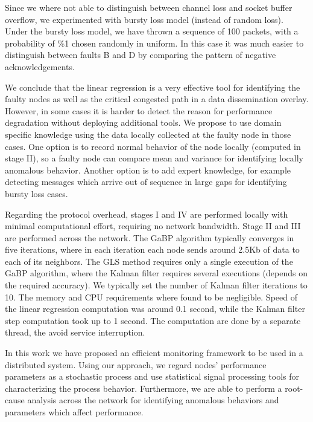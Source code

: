 \documentclass[times, 10pt,twocolumn]{article}
\begin{document}
Since we where not able to distinguish between channel loss and socket buffer overflow, we experimented
with bursty loss model (instead of random loss). Under the bursty loss model, we have thrown a sequence of 100 packets, with a probability of \%1 chosen randomly in uniform. In this case it was much easier to distinguish between faults
B and D by comparing the pattern of negative acknowledgements.

We conclude that the linear regression is a very effective tool for identifying the faulty nodes as well
as the critical congested path in a data dissemination overlay. However, in some cases it is harder to detect
the reason for performance degradation without deploying additional tools. We propose to use domain specific
knowledge using the data locally collected at the faulty node in those cases. One option is to record normal
behavior of the node locally (computed in stage II), so a faulty node can compare mean and variance for identifying
locally anomalous behavior. Another option is to add expert knowledge, for example detecting messages which arrive
out of sequence in large gaps for identifying bursty loss cases.





Regarding the protocol overhead, stages I and IV are performed locally with minimal computational effort, requiring no
network bandwidth. Stage II and III are performed across the network. The GaBP algorithm typically converges in five iterations, where in each iteration each node sends around 2.5Kb of data to each of its neighbors.  The GLS method
requires only a single execution of the GaBP algorithm, where the Kalman filter requires several executions (depends
on the required accuracy). We typically set the number of Kalman filter iterations to 10. The memory and CPU
requirements where found to be negligible. Speed of the linear regression computation was around 0.1 second, while
the Kalman filter step computation took up to 1 second. The computation are done by a separate thread, the avoid
service interruption.


\label{sec:conc}
In this work we have proposed an efficient monitoring framework to be used in a distributed system.
Using our approach, we regard nodes' performance parameters as a stochastic process and use statistical signal processing tools for characterizing the process behavior. Furthermore, we are able to perform a root-cause analysis across the network for identifying anomalous behaviors and parameters which affect performance.
\end{document}
